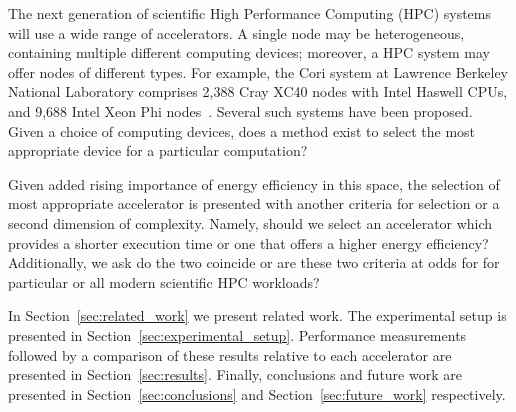 \documentclass[../document.tex]{subfiles}
\begin{document}
\label{sec:introduction}

The next generation of scientific High Performance Computing (HPC) systems will use a wide range of accelerators.
A single node may be heterogeneous, containing multiple different computing devices; moreover, a HPC system may offer nodes of different types.
For example, the Cori system at Lawrence Berkeley National Laboratory comprises 2,388 Cray XC40 nodes with Intel Haswell CPUs, and 9,688 Intel Xeon Phi nodes~\cite{declerck2016cori}.
Several such systems have been proposed. 
Given a choice of computing devices, does a method exist to select the most appropriate device for a particular computation?


Given added rising importance of energy efficiency in this space, the selection of most appropriate accelerator is presented with another criteria for selection or a second dimension of complexity.
Namely, should we select an accelerator which provides a shorter execution time or one that offers a higher energy efficiency?
Additionally, we ask do the two coincide or are these two criteria at odds for for particular or all modern scientific HPC workloads?

In Section~\ref{sec:related_work} we present related work.
The experimental setup is presented in Section~\ref{sec:experimental_setup}.
Performance measurements followed by a comparison of these results relative to each accelerator are presented in Section~\ref{sec:results}.
Finally, conclusions and future work are presented in Section~\ref{sec:conclusions} and Section~\ref{sec:future_work} respectively.
\end{document}
